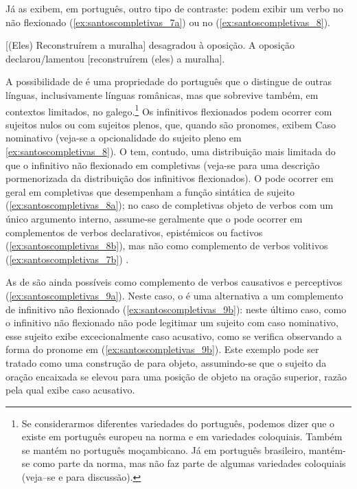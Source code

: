\documentclass[output=paper]{LSP/langsci}
\begin{document}
Já as  exibem, em português, outro tipo de contraste: podem exibir um verbo no  não flexionado (\ref{ex:santoscompletivas_7a}) ou no  (\ref{ex:santoscompletivas_8}).

\ea\label{ex:santoscompletivas_7}
\zl

\ea\label{ex:santoscompletivas_8}
\ea\label{ex:santoscompletivas_8a} [(Eles) Reconstruírem a muralha] desagradou à oposição.
\ex\label{ex:santoscompletivas_8b} A oposição declarou/lamentou [reconstruírem (eles) a muralha].
\zl

A possibilidade de  é uma propriedade do português que o distingue de outras línguas, inclusivamente línguas românicas, mas que sobrevive também, em contextos limitados, no galego.\footnote{Se considerarmos diferentes variedades do português, podemos dizer que o  existe em português europeu na norma e em variedades coloquiais. Também se mantém no português moçambicano. Já em português brasileiro, mantém-se como parte da norma, mas não faz parte de algumas variedades coloquiais (veja--se \citealt{piresrothman2009} e \citealt{pires_etal2011} para discussão).} Os infinitivos flexionados podem ocorrer com sujeitos nulos ou com sujeitos plenos, que, quando são pronomes, exibem Caso nominativo (veja-se a opcionalidade do sujeito pleno em \ref{ex:santoscompletivas_8}). O  tem, contudo, uma distribuição mais limitada do que o infinitivo não flexionado em completivas (veja-se \citealt{duarte_etal2016} para uma descrição pormenorizada da distribuição dos infinitivos flexionados). O  pode ocorrer em geral em completivas que desempenham a função sintática de sujeito (\ref{ex:santoscompletivas_8a}); no caso de completivas objeto de verbos com um único argumento interno, assume-se geralmente que o  pode ocorrer em complementos de verbos declarativos, epistémicos ou factivos (\ref{ex:santoscompletivas_8b}), mas não como complemento de verbos volitivos (\ref{ex:santoscompletivas_7b}) \citep{raposo1987}. 

As  de  são ainda possíveis como complemento de verbos causativos e perceptivos (\ref{ex:santoscompletivas_9a}). Neste caso, o  é uma alternativa a um complemento de infinitivo não flexionado (\ref{ex:santoscompletivas_9b}): neste último caso, como o infinitivo não flexionado não pode legitimar um sujeito com caso nominativo, esse sujeito exibe excecionalmente caso acusativo, como se verifica observando a forma do pronome em (\ref{ex:santoscompletivas_9b}). Este exemplo pode ser tratado como uma construção de  para objeto, assumindo-se que o sujeito da oração encaixada se elevou para uma posição de objeto na oração superior, razão pela qual exibe caso acusativo.
\end{document}
